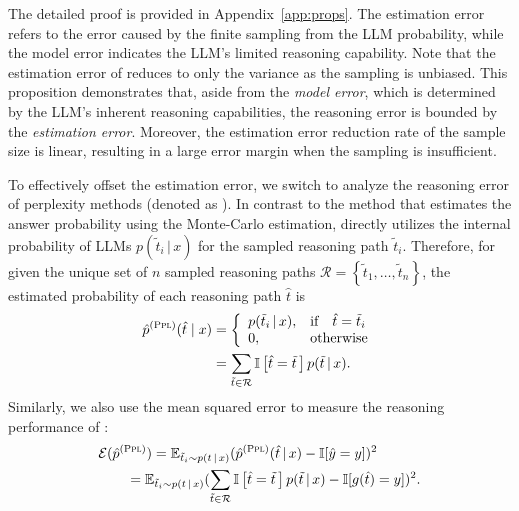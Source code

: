 \begin{remark}
The detailed proof is provided in Appendix~\ref{app:props}.
The estimation error refers to the error caused by the finite sampling from the LLM probability, while the model error indicates the LLM's limited reasoning capability.
Note that the estimation error of \SC reduces to only the variance as the sampling is unbiased.
This proposition demonstrates that, aside from the \emph{model error}, which is determined by the LLM's inherent reasoning capabilities,
the reasoning error is bounded by the \emph{estimation error}.
Moreover, the estimation error reduction rate of the sample size is linear, resulting in a large error margin when the sampling is insufficient.
\end{remark}

To effectively offset the estimation error, we switch to analyze the reasoning error of perplexity methods (denoted as \PP).
In contrast to the \SC method that estimates the answer probability using the Monte-Carlo estimation, \PP directly utilizes the internal probability of LLMs $p(\tilde{t}_i \,|\, x)$ for the sampled reasoning path $\tilde{t}_i$. 
Therefore, for given the unique set of $n$ sampled reasoning paths $\mathcal{R} = \left \{ \tilde{t}_1, \ldots, \tilde{t}_n \right \}$, the estimated probability of each reasoning path $\hat{t}$ is
\begin{equation*}
\begin{aligned}
\hat{p}^{(\textsc{Ppl})}(\hat{t} \mid x) &= \left\{
\begin{array}{ll}
p(\tilde{t}_i \,|\, x), & \text{if} \quad \hat{t} = \tilde{t}_i \\
0, & \text{otherwise}
\end{array}
\right. \\
&= \sum_{\tilde{t} \in \mathcal{R}} \mathbb{I}\left [\hat{t} = \tilde{t} \, \right ] p(\tilde{t} \,|\, x).
\end{aligned}
\end{equation*}
Similarly, we also use the mean squared error to measure the reasoning performance of \PP:
\begin{equation*}
\begin{aligned}
& \mathcal{E}(\hat{p}^{(\textsc{Ppl})}) = \mathbb{E}_{\tilde{t}_i \sim p(t \,|\, x)}( \hat{p}^{(\textsc{Ppl})}(\hat{t} \,|\, x) - \mathbb{I}[\hat{y} = y] )^2 \\
& \qquad =\mathbb{E}_{\tilde{t}_i \sim p(t \,|\, x)}( \sum_{\tilde{t}\in \mathcal{R}} \mathbb{I}\left [\hat{t} = \tilde{t} \, \right ] p(\tilde{t} \,|\, x) - \mathbb{I}[g(\hat{t}) = y] )^2.
\end{aligned}
\end{equation*}
